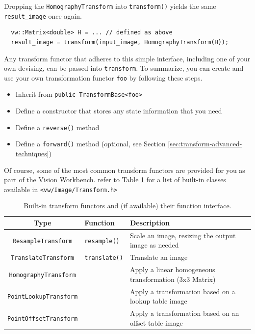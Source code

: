 Dropping the \verb#HomographyTransform# into \verb#transform()# yields
the same \verb#result_image# once again.

\begin{verbatim} 
  vw::Matrix<double> H = ... // defined as above
  result_image = transform(input_image, HomographyTransform(H));
\end{verbatim}

Any transform functor that adheres to this simple interface, including
one of your own devising, can be passed into \verb#transform#.  To
summarize, you can create and use your own transformation functor
\verb#foo# by following these steps.
\begin{itemize}
\item Inherit from \verb#public TransformBase<foo>#
\item Define a constructor that stores any state information that you need
\item Define a \verb#reverse()# method 
\item Define a \verb#forward()# method (optional, see Section \ref{sec:transform-advanced-techniques})
\end{itemize}

Of course, some of the most common transform functors are provided for
you as part of the Vision Workbench.  refer to Table
\ref{tbl:transform-functors} for a list of built-in classes available
in \verb#<vw/Image/Transform.h>#

\begin{table}[tbh]\begin{centering}
\begin{tabular}{|c|l|l|} \hline
Type & Function & Description \\ \hline \hline
\verb#ResampleTransform# & \verb#resample()# & Scale an image, resizing the output image as needed \\ \hline
\verb#TranslateTransform# & \verb#translate()# & Translate an image \\ \hline
\verb#HomographyTransform# & & Apply a linear homogeneous transformation (3x3 Matrix)  \\ \hline
\verb#PointLookupTransform# & & Apply a transformation based on a lookup table image  \\ \hline
\verb#PointOffsetTransform# & & Apply a transformation based on an offset table image \\ \hline
\end{tabular}
\caption{Built-in transform functors and (if available) their function interface.}
\label{tbl:transform-functors}
\end{centering}\end{table}

